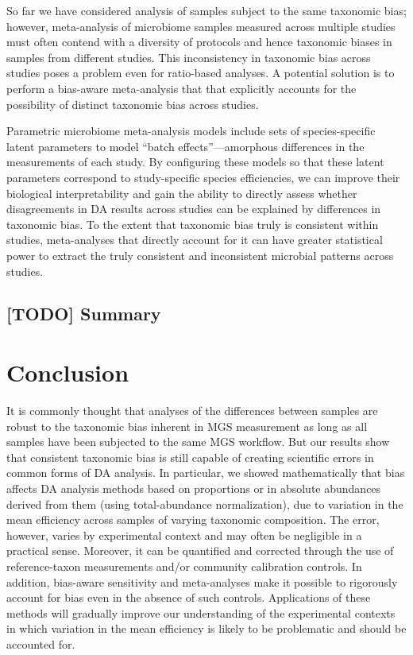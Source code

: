 \documentclass[
]{article}
\begin{document}
So far we have considered analysis of samples subject to the same taxonomic bias;
however, meta-analysis of microbiome samples measured across multiple studies must often contend with a diversity of protocols and hence taxonomic biases in samples from different studies.
This inconsistency in taxonomic bias across studies poses a problem even for ratio-based analyses.
A potential solution is to perform a bias-aware meta-analysis that that explicitly accounts for the possibility of distinct taxonomic bias across studies.

Parametric microbiome meta-analysis models include sets of species-specific latent parameters to model ``batch effects''---amorphous differences in the measurements of each study.
By configuring these models so that these latent parameters correspond to study-specific species efficiencies, we can improve their biological interpretability and gain the ability to directly assess whether disagreements in DA results across studies can be explained by differences in taxonomic bias.
To the extent that taxonomic bias truly is consistent within studies, meta-analyses that directly account for it can have greater statistical power to extract the truly consistent and inconsistent microbial patterns across studies.

\hypertarget{todo-summary}{%
\subsection{{[}TODO{]} Summary}\label{todo-summary}}

\hypertarget{conclusion}{%
\section{Conclusion}\label{conclusion}}

It is commonly thought that analyses of the differences between samples are robust to the taxonomic bias inherent in MGS measurement as long as all samples have been subjected to the same MGS workflow.
But our results show that consistent taxonomic bias is still capable of creating scientific errors in common forms of DA analysis.
In particular, we showed mathematically that bias affects DA analysis methods based on proportions or in absolute abundances derived from them (using total-abundance normalization), due to variation in the mean efficiency across samples of varying taxonomic composition.
The error, however, varies by experimental context and may often be negligible in a practical sense.
Moreover, it can be quantified and corrected through the use of reference-taxon measurements and/or community calibration controls.
In addition, bias-aware sensitivity and meta-analyses make it possible to rigorously account for bias even in the absence of such controls.
Applications of these methods will gradually improve our understanding of the experimental contexts in which variation in the mean efficiency is likely to be problematic and should be accounted for.
\end{document}
